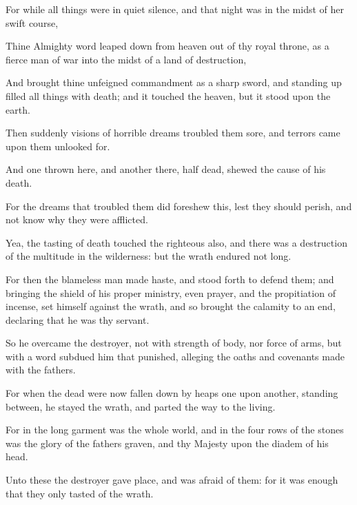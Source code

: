 {\par }{\PP {}For while all things were in quiet silence, and that night was in the midst of her swift course,
\par }{\PP {}Thine Almighty word leaped down from heaven out of thy royal throne, as a fierce man of war into the midst of a land of destruction,
\par }{\PP {}And brought thine unfeigned commandment as a sharp sword, and standing up filled all things with death; and it touched the heaven, but it stood upon the earth.
\par }{\PP {}Then suddenly visions of horrible dreams troubled them sore, and terrors came upon them unlooked for.
\par }{\PP {}And one thrown here, and another there, half dead, shewed the cause of his death.
\par }{\PP {}For the dreams that troubled them did foreshew this, lest they should perish, and not know why they were afflicted.
\par }{\PP {}Yea, the tasting of death touched the righteous also, and there was a destruction of the multitude in the wilderness: but the wrath endured not long.
\par }{\PP {}For then the blameless man made haste, and stood forth to defend them; and bringing the shield of his proper ministry, even prayer, and the propitiation of incense, set himself against the wrath, and so brought the calamity to an end, declaring that he was thy servant.
\par }{\PP {}So he overcame the destroyer, not with strength of body, nor force of arms, but with a word subdued him that punished, alleging the oaths and covenants made with the fathers.
\par }{\PP {}For when the dead were now fallen down by heaps one upon another, standing between, he stayed the wrath, and parted the way to the living.
\par }{\PP {}For in the long garment was the whole world, and in the four rows of the stones was the glory of the fathers graven, and thy Majesty upon the diadem of his head.
\par }{\PP {}Unto these the destroyer gave place, and was afraid of them: for it was enough that they only tasted of the wrath.

}
